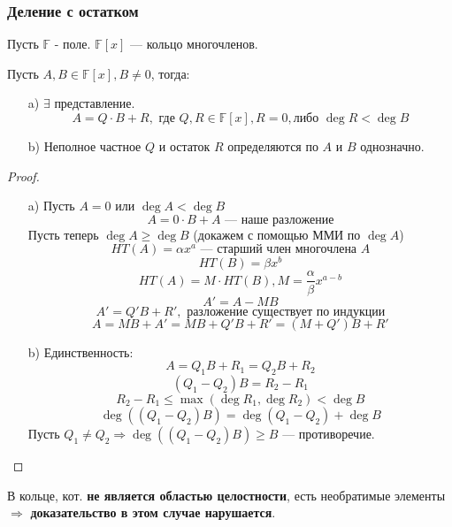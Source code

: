 \subsubsection{Деление с остатком}
Пусть $\mathbb{F}$ - поле. $\mathbb{F}[x]$ --- кольцо многочленов.
\begin{theorem}
\label{theorem:01_1}
Пусть $A, B \in \mathbb{F}[x], B \neq 0$, тогда:
\begin{itemize}
  \item [a) ] $\exists$ представление.
    \[
    A = Q \cdot B + R, \text{ где } Q, R \in \mathbb{F}[x], R = 0, \text{либо } \deg R < \deg B
    \]
  \item [b) ] Неполное частное $Q$ и остаток $R$ определяются по $A$ и $B$ однозначно.
\end{itemize}
\end{theorem}
\begin{proof}
  \begin{itemize}
    \item [a) ] Пусть $A = 0$ или $\deg A < \deg B$
      \[
      A = 0 \cdot B + A \text{ --- наше разложение}
      \]
      Пусть теперь $\deg A \geq \deg B$ (докажем с помощью ММИ по $\deg A$)
      \[
      HT(A) = \alpha x^{a} \text{ --- старший член многочлена $A$}
      \]
      \[
      HT(B) = \beta x^{b}
      \]
      \[
      HT(A) = M \cdot HT(B), M = \frac{\alpha}{\beta}x^{a - b}
      \]
      \[
      A' = A - MB
      \]
      \[
      A' = Q' B + R', \text{ разложение существует по индукции}
      \]
      \[
      A = MB + A' = MB + Q'B + R' = (M + Q')B + R'
      \]
    \item [b) ] Единственность:
      \[
      A = Q_1 B + R_1 = Q_2 B + R_2
      \]
      \[
        (Q_1 - Q_2) B = R_2 - R_1 
      \]
      \[
      R_2 - R_1 \leq \max(\deg R_1, \deg R_2) < \deg B
      \]
      \[
      \deg ((Q_1 - Q_2) B) = \deg(Q_1 - Q_2) + \deg B
      \]
      Пусть $Q_1 \neq Q_2 \Rightarrow \deg((Q_1 - Q_2) B) \geq B$ --- противоречие.
  \end{itemize}
\end{proof}
\begin{note}
В кольце, кот. \textbf{не является областью целостности}, есть необратимые элементы $\Rightarrow$ \textbf{доказательство в этом случае нарушается}.
\end{note}
